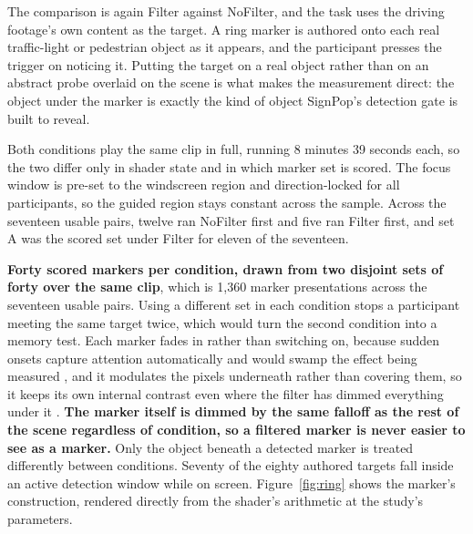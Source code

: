 The comparison is again Filter against NoFilter, and the task uses the driving footage's own content
as the target. A ring marker is authored onto each real traffic-light or pedestrian object as it
appears, and the participant presses the trigger on noticing it. Putting the target on a real object
rather than on an abstract probe overlaid on the scene is what makes the measurement direct: the
object under the marker is exactly the kind of object SignPop's detection gate is built to reveal.

Both conditions play the same clip in full, running 8 minutes 39 seconds each, so the two differ only
in shader state and in which marker set is scored. The focus window is pre-set to the windscreen
region and direction-locked for all participants, so the guided region stays constant across the
sample. Across the seventeen usable pairs, twelve ran NoFilter first and five ran Filter first, and
set A was the scored set under Filter for eleven of the seventeen.

\textbf{Forty scored markers per condition, drawn from two disjoint sets of forty over the same
clip}, which is 1,360 marker presentations across the seventeen usable pairs. Using a different set in
each condition stops a participant meeting the same target twice, which would turn the second
condition into a memory test. Each marker fades in rather than switching on, because sudden onsets
capture attention automatically and would swamp the effect being measured \citep{yantis1984}, and it
modulates the pixels underneath rather than covering them, so it keeps its own internal contrast even
where the filter has dimmed everything under it \citep{wallis2015}. \textbf{The marker itself is
dimmed by the same falloff as the rest of the scene regardless of condition, so a filtered marker is
never easier to see as a marker.} Only the object beneath a detected marker is treated differently
between conditions. Seventy of the eighty authored targets fall inside an active detection window
while on screen. Figure~\ref{fig:ring} shows the marker's construction, rendered directly from the
shader's arithmetic at the study's parameters.

